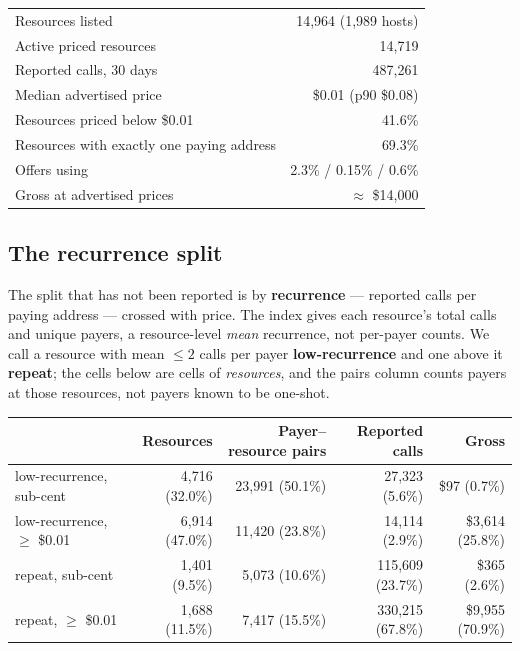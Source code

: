 \documentclass[11pt,a4paper]{article}
\newcommand{\code}[1]{\texttt{\seqbreak{#1}}}
\newcommand{\seqbreak}[1]{\begingroup\lccode`~=`/ \lowercase{\def~{/\allowbreak}}%
  \lccode`~=`. \lowercase{\def~{.\allowbreak}}%
  \lccode`~=`- \lowercase{\def~{-\allowbreak}}%
  \lccode`~=`_ \lowercase{\def~{\textunderscore\allowbreak}}%
  \catcode`/=13 \catcode`.=13 \catcode`-=13 \catcode`_=13 \scantokens{#1\noexpand}\endgroup}
\newcommand{\dollar}[1]{\$#1}
\begin{document}
\begin{center}\small
\begin{tabular}{@{}>{\raggedright\arraybackslash}p{10.5cm}r@{}}
\toprule
Resources listed & 14,964 (1,989 hosts) \\
Active priced resources & 14,719 \\
Reported calls, 30 days & 487,261 \\
Median advertised price & \dollar{0.01} (p90 \dollar{0.08}) \\
Resources priced below \dollar{0.01} & 41.6\% \\
Resources with exactly one paying address & 69.3\% \\
Offers using \code{upto} / \code{batch-settlement} / Gateway batched \code{exact} & 2.3\% / 0.15\% / 0.6\% \\
Gross at advertised prices & $\approx$ \dollar{14,000} \\
\bottomrule
\end{tabular}
\end{center}

\subsection{The recurrence split}

The split that has not been reported is by \textbf{recurrence} --- reported calls per paying address --- crossed
with price. The index gives each resource's total calls and unique payers, a resource-level \emph{mean}
recurrence, not per-payer counts. We call a resource with mean $\le 2$ calls per payer \textbf{low-recurrence}
and one above it \textbf{repeat}; the cells below are cells of \emph{resources}, and the pairs column counts
payers at those resources, not payers known to be one-shot.

\begin{center}\small
\begin{tabular}{@{}lrrrr@{}}
\toprule
& Resources & Payer--resource pairs & Reported calls & Gross \\
\midrule
low-recurrence, sub-cent & 4,716 (32.0\%) & 23,991 (50.1\%) & 27,323 (5.6\%) & \dollar{97} (0.7\%) \\
low-recurrence, $\ge$ \dollar{0.01} & 6,914 (47.0\%) & 11,420 (23.8\%) & 14,114 (2.9\%) & \dollar{3,614} (25.8\%) \\
repeat, sub-cent & 1,401 (9.5\%) & 5,073 (10.6\%) & 115,609 (23.7\%) & \dollar{365} (2.6\%) \\
repeat, $\ge$ \dollar{0.01} & 1,688 (11.5\%) & 7,417 (15.5\%) & 330,215 (67.8\%) & \dollar{9,955} (70.9\%) \\
\bottomrule
\end{tabular}
\end{center}
\end{document}
